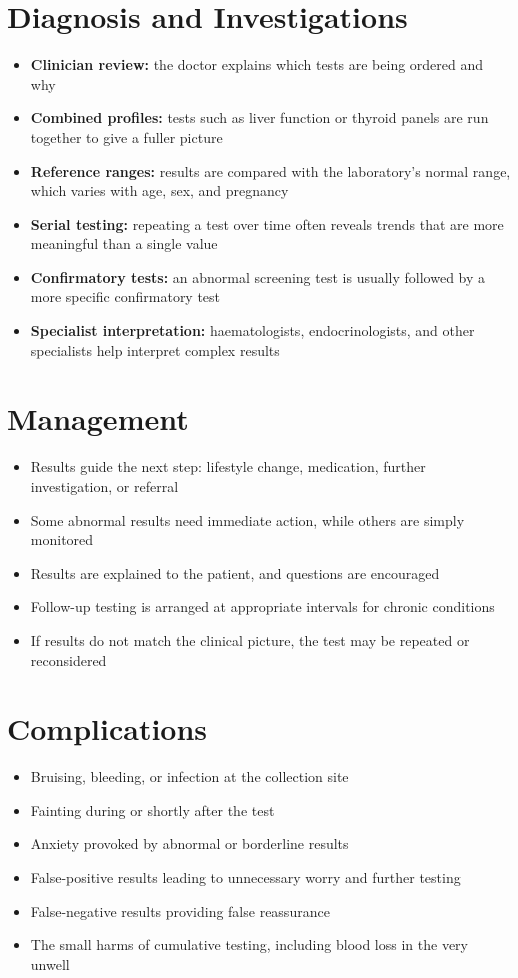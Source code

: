 \section*{Diagnosis and Investigations}
\begin{itemize}
    \item \textbf{Clinician review:} the doctor explains which tests are being ordered and why
    \item \textbf{Combined profiles:} tests such as liver function or thyroid panels are run together to give a fuller picture
    \item \textbf{Reference ranges:} results are compared with the laboratory's normal range, which varies with age, sex, and pregnancy
    \item \textbf{Serial testing:} repeating a test over time often reveals trends that are more meaningful than a single value
    \item \textbf{Confirmatory tests:} an abnormal screening test is usually followed by a more specific confirmatory test
    \item \textbf{Specialist interpretation:} haematologists, endocrinologists, and other specialists help interpret complex results
\end{itemize}

\section*{Management}
\begin{itemize}
    \item Results guide the next step: lifestyle change, medication, further investigation, or referral
    \item Some abnormal results need immediate action, while others are simply monitored
    \item Results are explained to the patient, and questions are encouraged
    \item Follow-up testing is arranged at appropriate intervals for chronic conditions
    \item If results do not match the clinical picture, the test may be repeated or reconsidered
\end{itemize}

\section*{Complications}
\begin{itemize}
    \item Bruising, bleeding, or infection at the collection site
    \item Fainting during or shortly after the test
    \item Anxiety provoked by abnormal or borderline results
    \item False-positive results leading to unnecessary worry and further testing
    \item False-negative results providing false reassurance
    \item The small harms of cumulative testing, including blood loss in the very unwell
\end{itemize}


